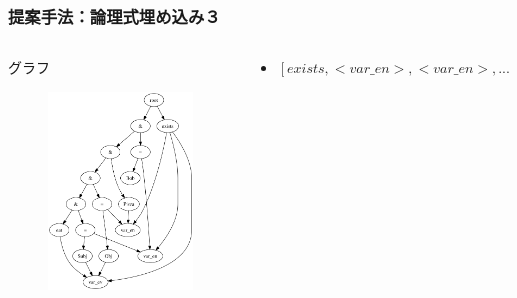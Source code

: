 \documentclass[dvipdfmx,cjk]{beamer}
\begin{document}
\begin{frame}
\frametitle{提案手法：論理式埋め込み３}
\begin{columns}[t]
    \begin{column}{0.5\textwidth} %
      \begin{block}{グラフ}
        \begin{figure}[h]
        	\includegraphics[width=4cm]{graph.png}
                \label{fig:graph}
        \end{figure}
      \end{block}
    \end{column}
    \begin{column}{0.5\textwidth} %
      \begin{block}{}
        \begin{itemize}
          \item $[exists,<var\_en>,<var\_en>,...]$
        \end{itemize}
      \end{block}
    \end{column}
\end{columns}

\end{frame}




\end{document}
